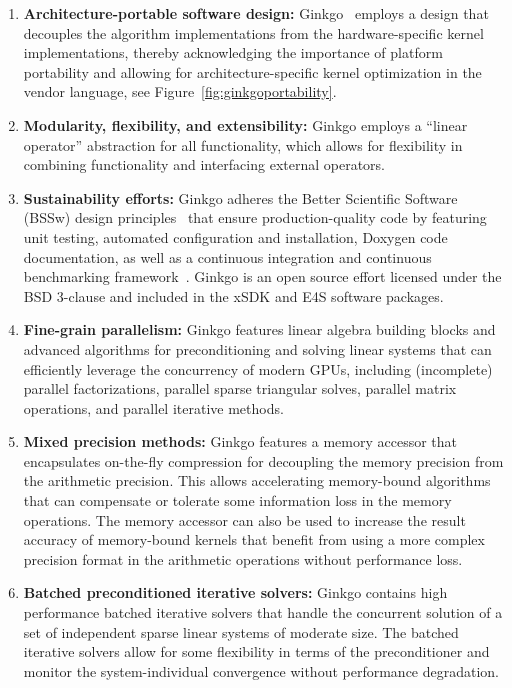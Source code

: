 \begin{enumerate}
  \item \textbf{Architecture-portable software design:}
		Ginkgo~\cite{anzt2020ginkgo} employs a design that decouples the
		algorithm implementations from the hardware-specific kernel
		implementations, thereby acknowledging the importance of platform
		portability and allowing for architecture-specific kernel optimization
		in the vendor language, see Figure~\ref{fig:ginkgoportability}.
  \item \textbf{Modularity, flexibility, and extensibility:} Ginkgo employs a
		``linear operator'' abstraction for all functionality, which allows for
		flexibility in combining functionality and interfacing external
		operators.
  \item \textbf{Sustainability efforts:} Ginkgo adheres the Better Scientific
		Software (BSSw) design principles~\cite{betterscientificsoftware} that
		ensure production-quality code by featuring unit testing, automated
		configuration and installation, Doxygen code documentation, as well as a
		continuous integration and continuous benchmarking
		framework~\cite{pasc_anzt}. Ginkgo is an open source effort licensed
		under the BSD 3-clause and included in the xSDK and E4S software
		packages.
  \item \textbf{Fine-grain parallelism:} Ginkgo features linear algebra building
		blocks and advanced algorithms for preconditioning and solving linear
		systems that can efficiently leverage the concurrency of modern GPUs,
		including (incomplete) parallel factorizations, parallel sparse
		triangular solves, parallel matrix operations, and parallel iterative
		methods.
  \item \textbf{Mixed precision methods:} Ginkgo features a memory accessor
		that encapsulates on-the-fly compression for decoupling the memory
		precision from the arithmetic precision. This allows accelerating
		memory-bound algorithms that can compensate or tolerate some information
		loss in the memory operations. The memory accessor can also be used to
		increase the result accuracy of memory-bound kernels that benefit from
		using a more complex precision format in the arithmetic operations
		without performance loss.
  \item \textbf{Batched preconditioned iterative solvers:} Ginkgo contains high
		performance batched iterative solvers that handle the concurrent
		solution of a set of independent sparse linear systems of moderate size.
		The batched iterative solvers allow for some flexibility in terms of the
		preconditioner and monitor the system-individual convergence without
		performance degradation.
\end{enumerate}

